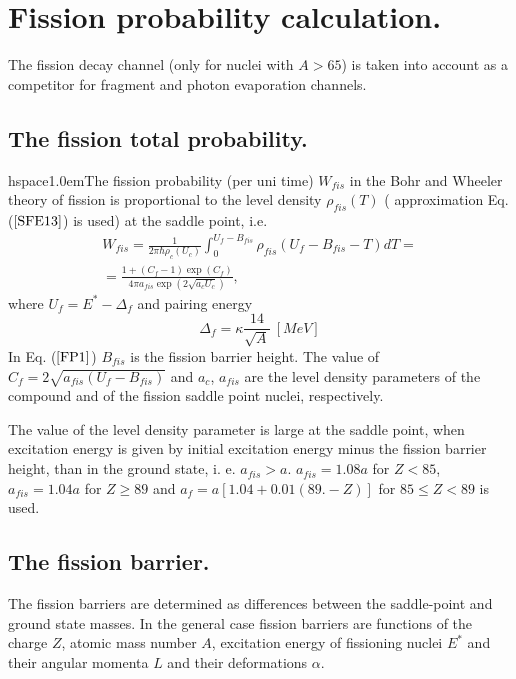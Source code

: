 \section{Fission probability calculation.}

\hspace{1.0em}The fission decay channel (only for nuclei with $A > 65$)
is taken into account as a competitor for fragment and photon evaporation
channels.

\subsection{The fission total probability.}
hspace{1.0em}The fission probability (per uni time) $W_{fis}$ 
in the Bohr
and Wheeler theory of fission \cite{BW39} is proportional to the level
density $\rho_{fis}(T)$ ( approximation Eq. ($\ref{SFE13}$) is used) at
the saddle point, i.e.
\begin{equation}
\begin{array}{c}
\label{FP1}W_{fis}=\frac{1}{2\pi \hbar \rho_c(U_c)}\int_{0}^{U_f-B_{fis}}
\rho_{fis}(U_f-B_{fis}-T)dT =\\
=\frac{1 + (C_f - 1)\exp{(C_f)}}{4\pi a_{fis} \exp{(2\sqrt{a_cU_c})}},
\end{array}
\end{equation}
where $U_f= E^{*} - \Delta_f$ and pairing energy
\begin{equation}
\label{FP2} \Delta_{f} = \kappa \frac{14}{\sqrt{A}} \ [MeV]
\end{equation} 
In Eq. ($\ref{FP1}$)  $B_{fis}$ is the fission barrier height.
The value of $C_f = 2\sqrt{a_{fis}(U_f - B_{fis})}$ and $a_c$, $a_{fis}$ are 
the level density parameters of the compound and of the fission saddle point
nuclei, respectively.

The value of the level density parameter is large at the saddle point,
when excitation energy is given by initial excitation energy minus the
fission barrier height, than in the ground state, i. e. $a_{fis} > a$.
$a_{fis} = 1.08 a$ for $Z < 85$, $a_{fis} = 1.04 a$ for $Z \geq 89$ and
$a_f=a[1.04+0.01(89.-Z)]$ for $85 \leq Z < 89$ is used.
 
\subsection{The fission barrier.}

\hspace{1.0em}
The fission barriers are determined as differences 
between the saddle-point and
 ground state masses. In the general case fission barriers are functions 
 of the charge $Z$, atomic mass number $A$, excitation energy of fissioning 
 nuclei $E^{*}$ and their angular momenta $L$ and their deformations 
 $\alpha$. 
 
